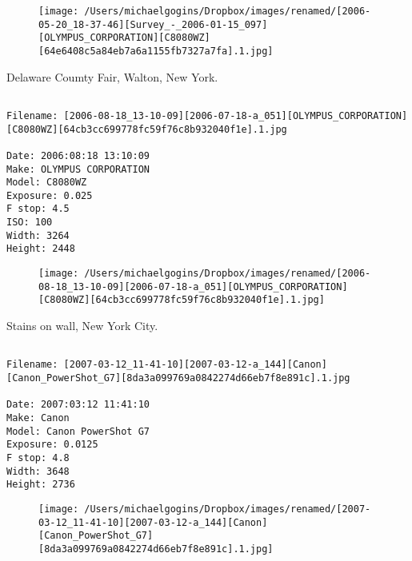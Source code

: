 \begin{figure}
\texttt{[image: /Users/michaelgogins/Dropbox/images/renamed/[2006-05-20\_18-37-46][Survey\_-\_2006-01-15\_097][OLYMPUS\_CORPORATION][C8080WZ][64e6408c5a84eb7a6a1155fb7327a7fa].1.jpg]}
\end{figure}
    
\clearpage
\onecolumn
\noindent Delaware Coumty Fair, Walton, New York.
\noindent
\begin{lstlisting}

Filename: [2006-08-18_13-10-09][2006-07-18-a_051][OLYMPUS_CORPORATION][C8080WZ][64cb3cc699778fc59f76c8b932040f1e].1.jpg

Date: 2006:08:18 13:10:09
Make: OLYMPUS CORPORATION
Model: C8080WZ
Exposure: 0.025
F stop: 4.5
ISO: 100
Width: 3264
Height: 2448
\end{lstlisting}
\clearpage

\begin{figure}
\texttt{[image: /Users/michaelgogins/Dropbox/images/renamed/[2006-08-18\_13-10-09][2006-07-18-a\_051][OLYMPUS\_CORPORATION][C8080WZ][64cb3cc699778fc59f76c8b932040f1e].1.jpg]}
\end{figure}
    
\clearpage
\onecolumn
\noindent Stains on wall, New York City.
\noindent
\begin{lstlisting}

Filename: [2007-03-12_11-41-10][2007-03-12-a_144][Canon][Canon_PowerShot_G7][8da3a099769a0842274d66eb7f8e891c].1.jpg

Date: 2007:03:12 11:41:10
Make: Canon
Model: Canon PowerShot G7
Exposure: 0.0125
F stop: 4.8
Width: 3648
Height: 2736
\end{lstlisting}
\clearpage

\begin{figure}
\texttt{[image: /Users/michaelgogins/Dropbox/images/renamed/[2007-03-12\_11-41-10][2007-03-12-a\_144][Canon][Canon\_PowerShot\_G7][8da3a099769a0842274d66eb7f8e891c].1.jpg]}
\end{figure}
    
